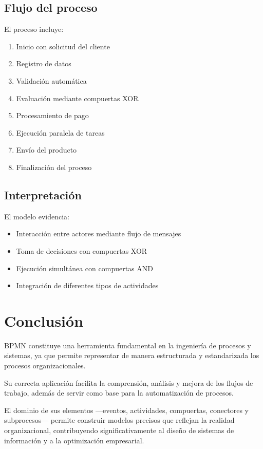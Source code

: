 \documentclass[12pt,a4paper]{article}
\begin{document}
\subsection{Flujo del proceso}

El proceso incluye:

\begin{enumerate}
    \item Inicio con solicitud del cliente
    \item Registro de datos
    \item Validación automática
    \item Evaluación mediante compuertas XOR
    \item Procesamiento de pago
    \item Ejecución paralela de tareas
    \item Envío del producto
    \item Finalización del proceso
\end{enumerate}

\subsection{Interpretación}

El modelo evidencia:

\begin{itemize}
    \item Interacción entre actores mediante flujo de mensajes
    \item Toma de decisiones con compuertas XOR
    \item Ejecución simultánea con compuertas AND
    \item Integración de diferentes tipos de actividades
\end{itemize}

\section{Conclusión}

BPMN constituye una herramienta fundamental en la ingeniería de procesos y sistemas, ya que permite representar de manera estructurada y estandarizada los procesos organizacionales.

Su correcta aplicación facilita la comprensión, análisis y mejora de los flujos de trabajo, además de servir como base para la automatización de procesos.

El dominio de sus elementos —eventos, actividades, compuertas, conectores y subprocesos— permite construir modelos precisos que reflejan la realidad organizacional, contribuyendo significativamente al diseño de sistemas de información y a la optimización empresarial.
\end{document}
